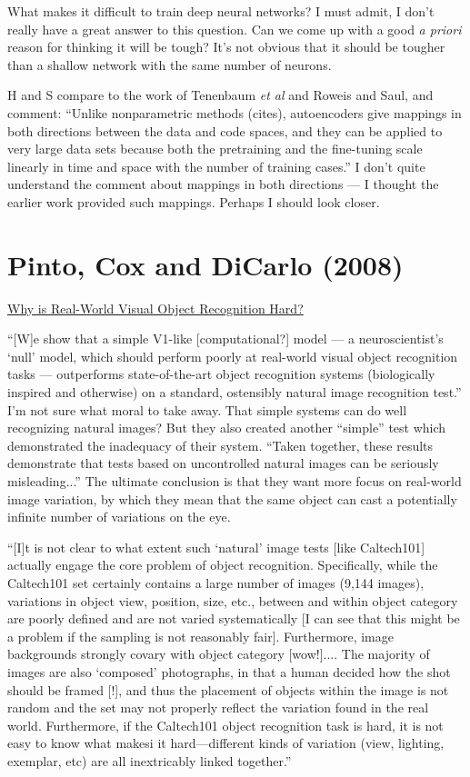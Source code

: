 \documentclass[12pt]{report}
\newcommand{\link}[2]{\href{#1}{#2}}
\begin{document}
What makes it difficult to train deep neural networks?  I must admit,
I don't really have a great answer to this question.  Can we come up
with a good \emph{a priori} reason for thinking it will be tough?
It's not obvious that it should be tougher than a shallow network with
the same number of neurons.

H and S compare to the work of Tenenbaum \emph{et al} and Roweis and
Saul, and comment: ``Unlike nonparametric methods (cites),
autoencoders give mappings in both directions between the data and
code spaces, and they can be applied to very large data sets because
both the pretraining and the fine-tuning scale linearly in time and
space with the number of training cases.''  I don't quite understand
the comment about mappings in both directions --- I thought the
earlier work provided such mappings.  Perhaps I should look closer.

\section{Pinto, Cox and DiCarlo (2008)}

\link{http://www.ploscompbiol.org/article/info\%3Adoi\%2F10.1371\%2Fjournal.pcbi.0040027}{Why is Real-World Visual Object Recognition Hard?}
 
``[W]e show that a simple V1-like [computational?] model --- a
neuroscientist's `null' model, which should perform poorly at
real-world visual object recognition tasks --- outperforms
state-of-the-art object recognition systems (biologically inspired and
otherwise) on a standard, ostensibly natural image recognition test.''
I'm not sure what moral to take away.  That simple systems can do well
recognizing natural images?  But they also created another ``simple''
test which demonstrated the inadequacy of their system.  ``Taken
together, these results demonstrate that tests based on uncontrolled
natural images can be seriously misleading...''  The ultimate
conclusion is that they want more focus on real-world image variation,
by which they mean that the same object can cast a potentially
infinite number of variations on the eye.

``[I]t is not clear to what extent such `natural' image tests [like
Caltech101] actually engage the core problem of object recognition.
Specifically, while the Caltech101 set certainly contains a large
number of images (9,144 images), variations in object view, position,
size, etc., between and within object category are poorly defined and
are not varied systematically [I can see that this might be a problem
if the sampling is not reasonably fair].  Furthermore, image
backgrounds strongly covary with object category [wow!].... The
majority of images are also `composed' photographs, in that a human
decided how the shot should be framed [!], and thus the placement of
objects within the image is not random and the set may not properly
reflect the variation found in the real world.  Furthermore, if the
Caltech101 object recognition task is hard, it is not easy to know
what makesi it hard---different kinds of variation (view, lighting,
exemplar, etc) are all inextricably linked together.''
\end{document}
